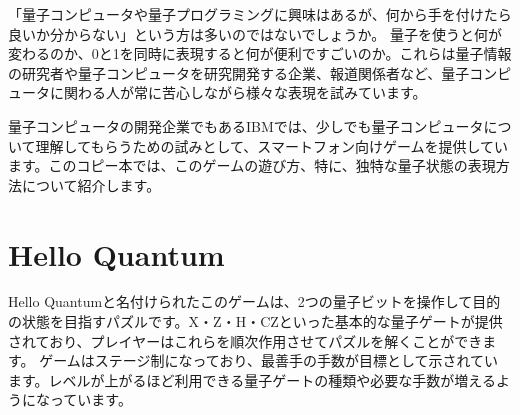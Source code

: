 
「量子コンピュータや量子プログラミングに興味はあるが、何から手を付けたら良いか分からない」という方は多いのではないでしょうか。
量子を使うと何が変わるのか、0と1を同時に表現すると何が便利ですごいのか。これらは量子情報の研究者や量子コンピュータを研究開発する企業、報道関係者など、量子コンピュータに関わる人が常に苦心しながら様々な表現を試みています。

量子コンピュータの開発企業でもあるIBMでは、少しでも量子コンピュータについて理解してもらうための試みとして、スマートフォン向けゲームを提供しています。このコピー本では、このゲームの遊び方、特に、独特な量子状態の表現方法について紹介します。

\section*{Hello Quantum}
\label{sec:1-1}

Hello Quantumと名付けられたこのゲームは、2つの量子ビットを操作して目的の状態を目指すパズルです。X・Z・H・CZといった基本的な量子ゲートが提供されており、プレイヤーはこれらを順次作用させてパズルを解くことができます。
ゲームはステージ制になっており、最善手の手数が目標として示されています。レベルが上がるほど利用できる量子ゲートの種類や必要な手数が増えるようになっています。

